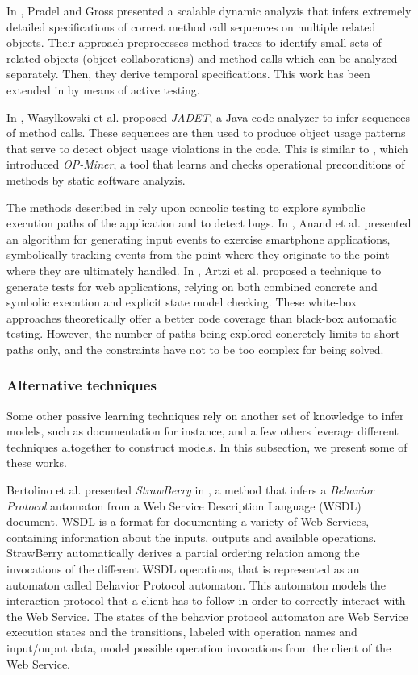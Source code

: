 In \cite{Pradel:2009}, Pradel and Gross presented a scalable
dynamic analyzis that infers extremely detailed specifications of
correct method call sequences on multiple related objects. Their
approach preprocesses method traces to identify small sets of
related objects (object collaborations) and method calls which
can be analyzed separately. Then, they derive temporal
specifications. This work has been extended in
\cite{Dallmeier_generatingtest} by means of active testing.

In \cite{Wasylkowski07detectingobject}, Wasylkowski et al.
proposed \textit{JADET}, a Java code analyzer to infer sequences
of method calls. These sequences are then used to produce object
usage patterns that serve to detect object usage violations in
the code. This is similar to
\cite{Wasylkowski_miningoperational}, which introduced
\textit{OP-Miner}, a tool that learns and checks operational
preconditions of methods by static software analyzis.

The methods described in \cite{concolicandroid12,5416728} rely
upon concolic testing to explore symbolic execution paths of the
application and to detect bugs. In \cite{concolicandroid12},
Anand et al. presented an algorithm for generating input events
to exercise smartphone applications, symbolically tracking events
from the point where they originate to the point where they are
ultimately handled. In \cite{5416728}, Artzi et al. proposed a
technique to generate tests for web applications, relying on both
combined concrete and symbolic execution and explicit state model
checking. These white-box approaches theoretically offer a better
code coverage than black-box automatic testing. However, the
number of paths being explored concretely limits to short paths
only, and the constraints have not to be too complex for being
solved.


\subsubsection{Alternative techniques}
\label{sec:passive-others}

Some other passive learning techniques rely on another set of
knowledge to infer models, such as documentation for instance,
and a few others leverage different techniques altogether to
construct models. In this subsection, we present some of these
works.

Bertolino et al. presented \textit{StrawBerry} in
\cite{Bertolino:2009:ASB:1595696.1595719}, a method that infers a
\textit{Behavior Protocol} automaton from a Web Service
Description Language (WSDL) document.  WSDL is a format for
documenting a variety of Web Services, containing information
about the inputs, outputs and available operations. StrawBerry
automatically derives a partial ordering relation among the
invocations of the different WSDL operations, that is represented
as an automaton called Behavior Protocol automaton.  This
automaton models the interaction protocol that a client has to
follow in order to correctly interact with the Web Service.  The
states of the behavior protocol automaton are Web Service
execution states and the transitions, labeled with operation
names and input/ouput data, model possible operation invocations
from the client of the Web Service.

